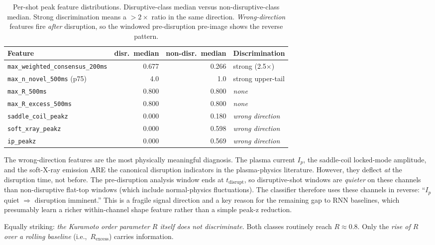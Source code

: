 \documentclass[11pt,letterpaper]{article}
\begin{document}
\begin{table}[h]
\centering
\caption{Per-shot peak feature distributions. Disruptive-class median
versus non-disruptive-class median. Strong discrimination means a
$>2\times$ ratio in the same direction. \emph{Wrong-direction} features
fire \emph{after} disruption, so the windowed pre-disruption pre-image
shows the reverse pattern.}
\label{tab:dist}
\begin{tabular}{l rr l}
\toprule
Feature & disr.\ median & non-disr.\ median & Discrimination \\
\midrule
\texttt{max\_weighted\_consensus\_200ms} & 0.677 & 0.266 & strong (2.5$\times$) \\
\texttt{max\_n\_novel\_500ms} (p75) & 4.0 & 1.0 & strong upper-tail \\
\texttt{max\_R\_500ms} & 0.800 & 0.800 & \emph{none} \\
\texttt{max\_R\_excess\_500ms} & 0.800 & 0.800 & \emph{none} \\
\texttt{saddle\_coil\_peakz} & 0.000 & 0.180 & \emph{wrong direction} \\
\texttt{soft\_xray\_peakz} & 0.000 & 0.598 & \emph{wrong direction} \\
\texttt{ip\_peakz} & 0.000 & 0.569 & \emph{wrong direction} \\
\bottomrule
\end{tabular}
\end{table}

The wrong-direction features are the most physically meaningful
diagnosis. The plasma current $I_p$, the saddle-coil locked-mode
amplitude, and the soft-X-ray emission ARE the canonical disruption
indicators in the plasma-physics literature. However, they deflect
\emph{at} the disruption time, not before. The pre-disruption analysis
window ends at $t_{\mathrm{disrupt}}$, so disruptive-shot windows are
\emph{quieter} on these channels than non-disruptive flat-top windows
(which include normal-physics fluctuations). The classifier therefore
uses these channels in reverse: ``$I_p$ quiet $\Rightarrow$ disruption
imminent.'' This is a fragile signal direction and a key reason for the
remaining gap to RNN baselines, which presumably learn a richer
within-channel shape feature rather than a simple peak-z reduction.

Equally striking: \emph{the Kuramoto order parameter $R$ itself does
not discriminate.} Both classes routinely reach $R \approx 0.8$. Only
the \emph{rise of $R$ over a rolling baseline} (i.e.,\ $R_{\mathrm{excess}}$)
carries information.
\end{document}
